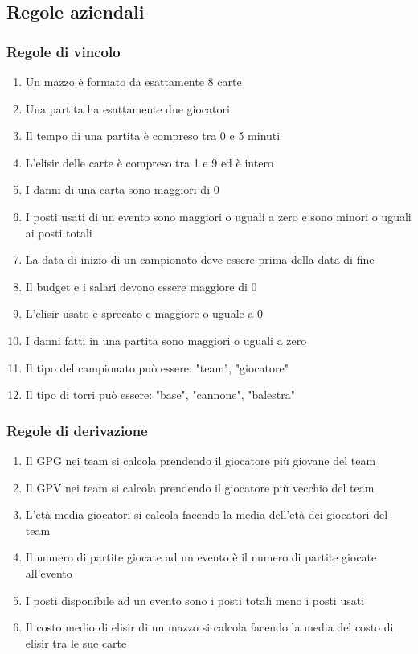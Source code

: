\documentclass{article}
\begin{document}
\subsection{Regole aziendali}

\subsubsection{Regole di vincolo}
\begin{enumerate}
    \item Un mazzo è formato da esattamente 8 carte
    \item Una partita ha esattamente due giocatori
    \item Il tempo di una partita è compreso tra 0 e 5 minuti
    \item L'elisir delle carte è compreso tra 1 e 9 ed è intero
    \item I danni di una carta sono maggiori di 0
    \item I posti usati di un evento sono maggiori o uguali a zero e sono minori o uguali ai posti totali
    \item La data di inizio di un campionato deve essere prima della data di fine
    \item Il budget e i salari devono essere maggiore di 0
    \item L'elisir usato e sprecato e maggiore o uguale a 0
    \item I danni fatti in una partita sono maggiori o uguali a zero
    \item Il tipo del campionato può essere: "team", "giocatore"
    \item Il tipo di torri può essere: "base", "cannone", "balestra"
\end{enumerate}

\subsubsection{Regole di derivazione}
\begin{enumerate}
    \item Il GPG nei team si calcola prendendo il giocatore più giovane del team
    \item Il GPV nei team si calcola prendendo il giocatore più vecchio del team
    \item L'età media giocatori si calcola facendo la media dell'età dei giocatori del team
    \item Il numero di partite giocate ad un evento è il numero di partite giocate all'evento
    \item I posti disponibile ad un evento sono i posti totali meno i posti usati
    \item Il costo medio di elisir di un mazzo si calcola facendo la media del costo di elisir tra le sue carte
\end{enumerate}
\end{document}
